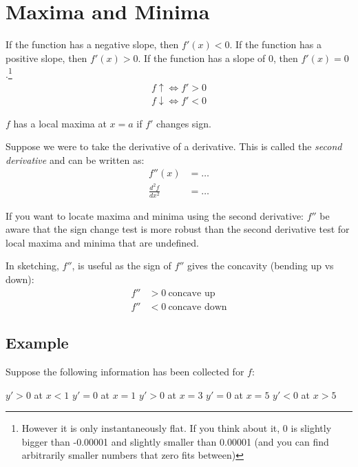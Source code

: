 \chapter{Maxima and Minima}
\label{chap:MaximaAndMinima}
If the function has a negative slope, then $f'(x) < 0$.
If the function has a positive slope, then $f'(x) > 0$.
If the function has a slope of $0$, then $f'(x) = 0$.\footnote{However it is
only instantaneously flat. If you think about it, 0 is slightly bigger than
-0.00001 and slightly smaller than 0.00001 (and you can find arbitrarily
smaller numbers that zero fits between)}
\begin{align}
  f \uparrow \Leftrightarrow f' > 0 \\
  f \downarrow \Leftrightarrow f' < 0
\end{align}

\noindent $f$ has a local maxima at $x=a$ if $f'$ changes sign.

Suppose we were to take the derivative of a derivative. This is called the
\emph{second derivative} and can be written as:
\begin{align}
              f''(x) & = \ldots \nonumber \\
  \frac{d^2 f}{dx^2} & = \ldots \nonumber
\end{align}

\noindent If you want to locate maxima and minima using the second derivative:
$f''$ be aware that the sign change test is more robust than the second
derivative test for local maxima and minima that are undefined.

\noindent In sketching, $f''$, is useful as the sign of $f''$ gives the
concavity (bending up vs down):
\begin{align}
  f'' &> 0 ~ \text{concave up} \\
  f'' &< 0 ~ \text{concave down}
\end{align}

\section{Example}
Suppose the following information has been collected for $f$:

$y' > 0$   at $x<1$
$y' = 0$   at $x=1$
$y' > 0$   at $x=3$
$y' = 0$   at $x=5$
$y' < 0$   at $x>5$

